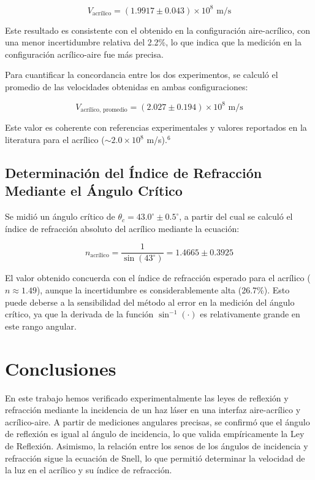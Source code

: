 \documentclass[article,12pt]{elsarticle}
\begin{document}
\begin{enumerate}
\begin{equation}
V_{\text{acrílico}} = (1.9917 \pm 0.043) \times 10^8 \text{ m/s}
\end{equation}

Este resultado es consistente con el obtenido en la configuración aire-acrílico, con una menor incertidumbre relativa del 2.2\%, lo que indica que la medición en la configuración acrílico-aire fue más precisa.

Para cuantificar la concordancia entre los dos experimentos, se calculó el promedio de las velocidades obtenidas en ambas configuraciones:

\begin{equation}
V_{\text{acrílico, promedio}} = (2.027 \pm 0.194) \times 10^8 \text{ m/s}
\end{equation}

Este valor es coherente con referencias experimentales y valores reportados en la literatura para el acrílico ($\sim 2.0 \times 10^8$ m/s).$^6$

\subsection{Determinación del Índice de Refracción Mediante el Ángulo Crítico}

Se midió un ángulo crítico de $\theta_c = 43.0^\circ \pm 0.5^\circ$, a partir del cual se calculó el índice de refracción absoluto del acrílico mediante la ecuación:

\begin{equation}
n_{\text{acrílico}} = \frac{1}{\sin(43^\circ)} = 1.4665 \pm 0.3925
\end{equation}

El valor obtenido concuerda con el índice de refracción esperado para el acrílico ($n \approx 1.49$), aunque la incertidumbre es considerablemente alta (26.7\%). Esto puede deberse a la sensibilidad del método al error en la medición del ángulo crítico, ya que la derivada de la función $\sin^{-1}(\cdot)$ es relativamente grande en este rango angular.

\section{Conclusiones}

En este trabajo hemos verificado experimentalmente las leyes de reflexión y refracción mediante la incidencia de un haz láser en una interfaz aire-acrílico y acrílico-aire. A partir de mediciones angulares precisas, se confirmó que el ángulo de reflexión es igual al ángulo de incidencia, lo que valida empíricamente la Ley de Reflexión. Asimismo, la relación entre los senos de los ángulos de incidencia y refracción sigue la ecuación de Snell, lo que permitió determinar la velocidad de la luz en el acrílico y su índice de refracción.\\


\end{enumerate}
\end{document}

